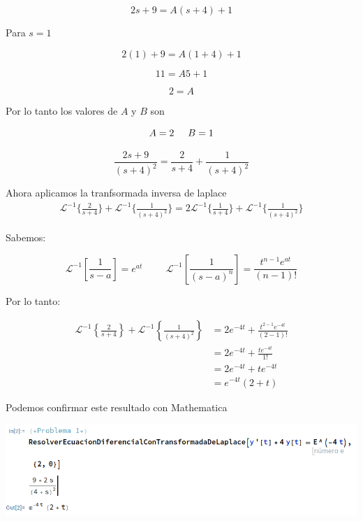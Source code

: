 \documentclass{article}
\begin{document}
\[2s+9 = A(s+4) + 1\]

Para $s=1$

\[2(1)+9 = A(1+4) + 1\]

\[11 = A5 + 1\]

\[2 = A\]

Por lo tanto los valores de $A$ y $B$ son

\[A=2 \hspace{.5cm} B=1\]

\[\frac{2s+9}{(s + 4)^2} = \frac{2}{s+4} + \frac{1}{(s+4)^2}\]

Ahora aplicamos la tranfsormada inversa de laplace
\begin{align*}
    \mathcal{L}^{-1}\{\frac{2}{s+4}\} + \mathcal{L}^{-1}\{\frac{1}{(s+4)^2}\} = 2\mathcal{L}^{-1}\{\frac{1}{s+4}\} + \mathcal{L}^{-1}\{\frac{1}{(s+4)^2}\}
\end{align*}

Sabemos:

\[ \mathcal{L}^{-1}[\frac{1}{s-a}] = e^{at} \hspace{1cm} \mathcal{L}^{-1}[\frac{1}{(s-a)^n}] = \frac{t^{n-1}e^{at}}{(n-1)!}\]

Por lo tanto:

\begin{align*}
    \mathcal{L}^{-1}\left\{\frac{2}{s+4}\right\} + \mathcal{L}^{-1}\left\{\frac{1}{(s+4)^2}\right\} & = 2e^{-4t} + \frac{t^{2-1}e^{-4t}}{(2-1)!} \\
                                                                                                    & = 2e^{-4t} + \frac{te^{-4t}}{1!}           \\
                                                                                                    & = 2e^{-4t} + te^{-4t}                      \\
                                                                                                    & = e^{-4t}(2+t)
\end{align*}


Podemos confirmar este resultado con Mathematica

\begin{center}
    \includegraphics[width=1\textwidth]{../../ED 2/image.png}
\end{center}
\newpage
\end{document}
